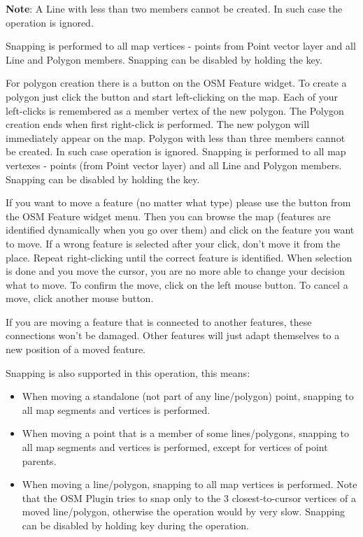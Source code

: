\textbf{Note}: A Line with less than two members cannot be created. In 
such case the operation is ignored.

Snapping is performed to all map vertices - points from Point vector layer
and all Line and Polygon members. Snapping can be disabled by holding the 
 key.


For polygon creation there is a  
button on the OSM Feature widget. To create a polygon just click the button 
and start left-clicking on the map. Each of your left-clicks is remembered as 
a member vertex of the new polygon. The Polygon creation ends when first 
right-click is performed. The new polygon will immediately appear on the map.
Polygon with less than three members cannot be created. In such case
operation is ignored. Snapping is performed to all map vertexes - points 
(from Point vector layer) and all Line and Polygon members. Snapping can be 
disabled by holding the  key.


If you want to move a feature (no matter what type) please use the
 button from the OSM Feature widget menu. 
Then you can browse the map (features are identified dynamically when you 
go over them) and click on the feature you want to move. If a wrong feature is
selected after your click, don't move it from the place. Repeat right-clicking
until the correct feature is identified. When selection is done and you move
the cursor, you are no more able to change your decision what to move.
To confirm the move, click on the left mouse button. To cancel a move, click 
another mouse button.

If you are moving a feature that is connected to another features, these
connections won't be damaged. Other features will just adapt themselves to
a new position of a moved feature. 

Snapping is also supported in this operation, this means: 

\begin{itemize}[label=--]
\item When moving a standalone (not part of any line/polygon) point, 
snapping to all map segments and vertices is performed.
\item When moving a point that is a member of some lines/polygons, 
snapping to all map segments and vertices is performed, except for 
vertices of point parents.
\item When moving a line/polygon, snapping to all map vertices is performed. 
Note that the OSM Plugin tries to snap only to the 3 closest-to-cursor 
vertices of a moved line/polygon, otherwise the operation would by very slow.
Snapping can be disabled by holding  key during the operation.
\end{itemize}

